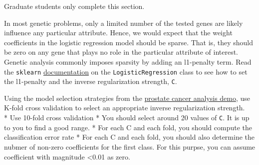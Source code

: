 \documentclass[11pt]{article}
\begin{document}
Graduate students only complete this section.

In most genetic problems, only a limited number of the tested genes are
likely influence any particular attribute. Hence, we would expect that
the weight coefficients in the logistic regression model should be
sparse. That is, they should be zero on any gene that plays no role in
the particular attribute of interest. Genetic analysis commonly imposes
sparsity by adding an l1-penalty term. Read the \texttt{sklearn}
\href{http://scikit-learn.org/stable/modules/generated/sklearn.linear_model.LogisticRegression.html}{documentation}
on the \texttt{LogisticRegression} class to see how to set the
l1-penalty and the inverse regularization strength, \texttt{C}.

Using the model selection strategies from the
\href{../unit03_model_sel/demo03_2_prostate.ipynb}{prostate cancer
analysis demo}, use K-fold cross validation to select an appropriate
inverse regularization strength.\\
* Use 10-fold cross validation * You should select around 20 values of
\texttt{C}. It is up to you to find a good range. * For each C and each
fold, you should compute the classification error rate * For each C and
each fold, you should also determine the nubmer of non-zero coefficients
for the first class. For this purpse, you can assume coefficient with
magnitude \textless{}0.01 as zero.
\end{document}

